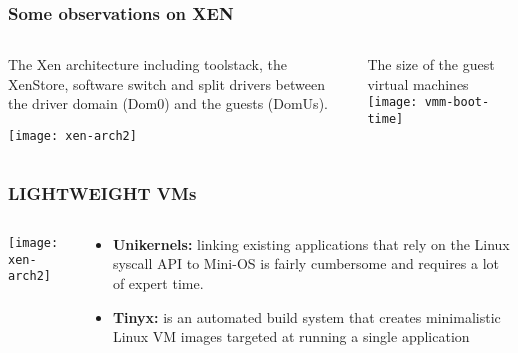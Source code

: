 \begin{frame}[plain]
	\frametitle{Some observations on XEN }
	
	
	
	\begin{columns}
		
		\begin{column}{.3\textwidth}
			The Xen architecture including toolstack, the
			XenStore, software switch and split drivers between
			the driver domain (Dom0) and the guests (DomUs).
			
			\texttt{[image: xen-arch2]}
			
		\end{column}
		
		\begin{column}{.7\textwidth}
			
			\small The size of the guest virtual machines
			\texttt{[image: vmm-boot-time]}
		\end{column}
		
		
	\end{columns}
	
	
\end{frame}


\begin{frame}[plain]
	\frametitle{LIGHTWEIGHT VMs }
	
	
	
	\begin{columns}
		
		\begin{column}{.3\textwidth}
		
			\texttt{[image: xen-arch2]}
			
		\end{column}
		
		\begin{column}{.7\textwidth}
			
\begin{itemize}			
	\item \textbf{Unikernels:} 
	linking existing applications that rely
	on the Linux syscall API to Mini-OS is fairly cumbersome and
	requires a lot of expert time.
	
	\item \textbf{Tinyx: }is an automated build system that creates minimalistic
	Linux VM images targeted at running a single application  
\end{itemize}

		\end{column}
		
		
	\end{columns}
	
	
\end{frame}

